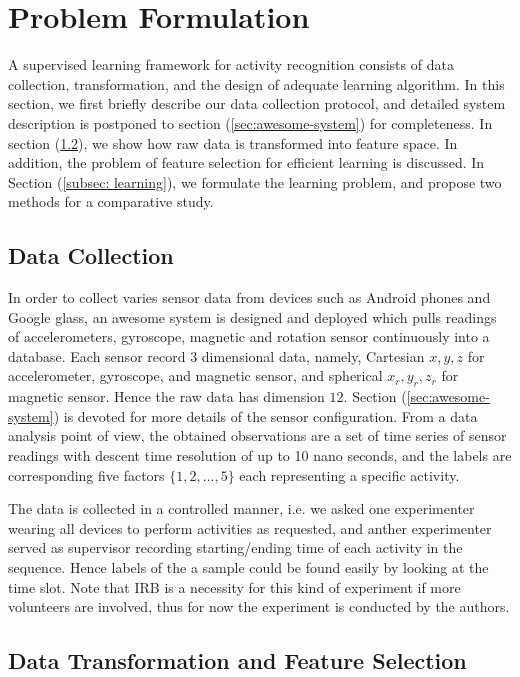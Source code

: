 
\section{Problem Formulation}
\label{sec:problem-formulation}

A supervised learning framework for activity recognition consists of data collection, transformation, and the design of adequate learning algorithm. In this section, we first briefly describe our data collection protocol, and detailed system description is postponed to section (\ref{sec:awesome-system}) for completeness. In section (\ref{subsec: data-transform}), we show how raw data is transformed into feature space. In addition, the problem of feature selection  for efficient learning is discussed. In Section (\ref{subsec: learning}), we formulate the learning problem, and propose two methods for a comparative study.  

\subsection{Data Collection}
\label{subsec: data-collection}
In order to collect varies sensor data from devices such as Android phones and Google glass, an awesome system is designed and deployed which pulls readings of accelerometers, gyroscope, magnetic and rotation sensor continuously into a database. Each sensor record 3 dimensional data, namely, Cartesian $x,y,z$ for accelerometer, gyroscope, and magnetic sensor, and spherical $x_r,y_r,z_r$ for magnetic sensor. Hence the raw data has dimension $12$. Section (\ref{sec:awesome-system}) is devoted for more details of the sensor configuration. From a data analysis point of view, the obtained observations are a set of time series of sensor readings with descent time resolution of up to 10 nano seconds, and the labels are corresponding five factors $\{1,2,...,5\}$ each representing a specific activity. 

The data is collected in a controlled manner, i.e. we asked one experimenter wearing all devices to perform activities as requested, and anther experimenter served as supervisor recording starting/ending time of each activity in the sequence. Hence labels of the a sample could be found easily by looking at the time slot. Note that IRB is a necessity for this kind of experiment if more volunteers are involved, thus for now the experiment is conducted by the authors. 

\subsection{Data Transformation and Feature Selection}
\label{subsec: data-transform}


